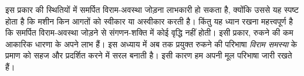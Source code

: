 \documentclass[../../../include/open-logic-section]{subfiles}
\begin{document}
\begin{explain}
इस प्रकार की स्थितियों में समर्पित विराम-अवस्था जोड़ना लाभकारी हो सकता
है, क्योंकि उससे यह स्पष्ट होता है कि मशीन किन आगतों को स्वीकार या
अस्वीकार करती है। किंतु यह ध्यान रखना महत्त्वपूर्ण है कि समर्पित
विराम-अवस्था जोड़ने से संगणन-शक्ति में कोई वृद्धि नहीं होती। इसी प्रकार,
रुकने की कम आकारिक धारणा के अपने लाभ हैं। इस अध्याय में अब तक प्रयुक्त
रुकने की परिभाषा \emph{विराम समस्या} के प्रमाण को सहज और प्रदर्शित करने
में सरल बनाती है। इसी कारण हम अपनी मूल परिभाषा जारी रखते हैं।
\end{explain}
\end{document}
